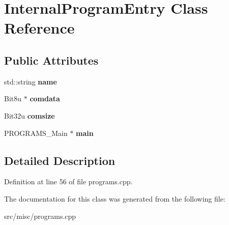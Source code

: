 \hypertarget{classInternalProgramEntry}{\section{Internal\-Program\-Entry Class Reference}
\label{classInternalProgramEntry}
}
\subsection*{Public Attributes}
\begin{DoxyCompactItemize}
\item 
\hypertarget{classInternalProgramEntry_ab03a0bab76bdea1d059d506329c3a263}{std\-::string {\bfseries name}}\label{classInternalProgramEntry_ab03a0bab76bdea1d059d506329c3a263}

\item 
\hypertarget{classInternalProgramEntry_abbd78db3ca9c4c8b882fc1a81d7227d1}{Bit8u $\ast$ {\bfseries comdata}}\label{classInternalProgramEntry_abbd78db3ca9c4c8b882fc1a81d7227d1}

\item 
\hypertarget{classInternalProgramEntry_ab361154b83327f64e5abc0d0ac1bfac5}{Bit32u {\bfseries comsize}}\label{classInternalProgramEntry_ab361154b83327f64e5abc0d0ac1bfac5}

\item 
\hypertarget{classInternalProgramEntry_ae8ad5361e417892dbd0b2284937f448a}{P\-R\-O\-G\-R\-A\-M\-S\-\_\-\-Main $\ast$ {\bfseries main}}\label{classInternalProgramEntry_ae8ad5361e417892dbd0b2284937f448a}

\end{DoxyCompactItemize}


\subsection{Detailed Description}


Definition at line 56 of file programs.\-cpp.



The documentation for this class was generated from the following file\-:\begin{DoxyCompactItemize}
\item 
src/misc/programs.\-cpp\end{DoxyCompactItemize}

